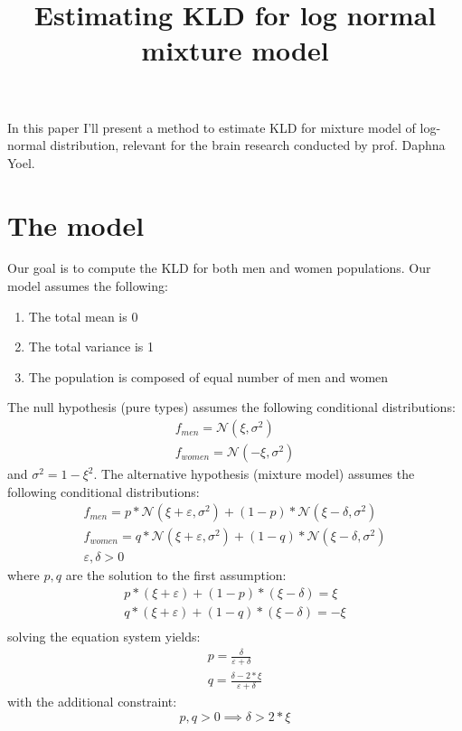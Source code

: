 \documentclass[12pt]{article}
\title{Estimating KLD for log normal mixture model}
\begin{document}
\maketitle
In this paper I'll present a method to estimate KLD for mixture model of log-normal distribution, relevant for the brain research conducted by prof. Daphna Yoel.
\section{The model}
Our goal is to compute the KLD for both men and women populations. Our model assumes the following:
	\begin{enumerate}
		\item The total mean is 0
		\item The total variance is 1 
		\item The population is composed of equal number of men and women
	\end{enumerate}
The null hypothesis (pure types) assumes the following conditional distributions:
\begin{gather}
f_{men} = \mathcal{N}(\xi, \sigma^2) \\
f_{women} = \mathcal{N}(-\xi, \sigma^2) 
\end{gather}
and $\sigma^2 = 1 - \xi^2$.
The alternative hypothesis (mixture model) assumes the following conditional distributions:
\begin{gather}
f_{men} = p * \mathcal{N}(\xi + \varepsilon, \sigma^2) + (1-p) * \mathcal{N}(\xi - \delta, \sigma^2) \\
f_{women} =  q * \mathcal{N}(\xi + \varepsilon, \sigma^2) + (1-q) * \mathcal{N}(\xi - \delta, \sigma^2) \\
\varepsilon, \delta > 0
\end{gather}
where $p,q$ are the solution to the first assumption:
\begin{gather*}
p * (\xi + \varepsilon) + (1-p) * (\xi - \delta) = \xi \\
q * (\xi + \varepsilon) + (1-q) * (\xi - \delta) = -\xi \\
\end{gather*}
solving the equation system yields:
\begin{gather*}
p = \frac{\delta}{\varepsilon + \delta} \\
q = \frac{\delta - 2 * \xi}{\varepsilon + \delta}
\end{gather*}
with the additional constraint:
\begin{equation}
p,q > 0 \implies \delta > 2 * \xi 
\end{equation}
\end{document}
